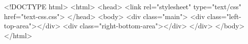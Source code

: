 <!DOCTYPE html>
<html>
  <head>
        <link rel="stylesheet" type="text/css" href="text-css.css">
  </head>
  <body>
  <div class="main">
       <div class="left-top-area"></div>
	   <div class="right-bottom-area"></div>
  </div>
  </body>
</html>
